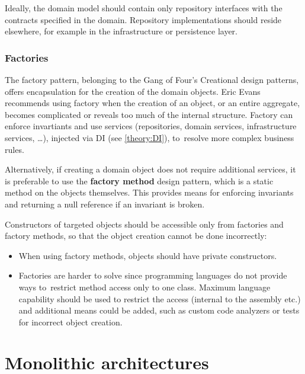 Ideally, the domain model should contain only repository interfaces with the contracts specified in the domain. Repository implementations should reside elsewhere, for example in the infrastructure or persistence layer.

\subsubsection{Factories}
The factory pattern, belonging to the Gang of Four's Creational design patterns,  offers encapsulation for the creation of the domain objects. Eric Evans \cite{eric_evans:ddd} recommends using factory when the creation of an object, or an entire aggregate, becomes complicated or reveals too much of the internal structure. Factory can enforce invartiants and use services (repositories, domain services, infrastructure services, \dots), injected via DI (see \ref{theory:DI}), to~resolve more complex business rules.

Alternatively, if creating a domain object does not require additional services, it is preferable to use the \textbf{factory method} design pattern, which is a static method on the objects themselves. This provides means for enforcing invariants and returning a null reference if an invariant is broken.

Constructors of targeted objects should be accessible only from factories and factory methods, so that the object creation cannot be done incorrectly:
\begin{itemize}
    \item When using factory methods, objects should have private constructors.
    
    \item Factories are harder to solve since programming languages do not provide ways to~restrict method access only to one class. Maximum language capability should be used to restrict the access (internal to the assembly etc.) and additional means could be added, such as custom code analyzers or tests for incorrect object creation.
\end{itemize}

\section{Monolithic architectures}
\label{theory:monolith_architectures}

